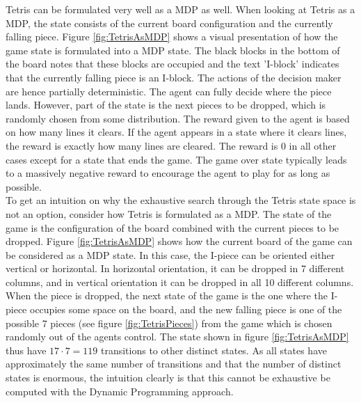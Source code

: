 Tetris can be formulated very well as a MDP as well.
When looking at Tetris as a MDP, the state consists
of the current board configuration and the currently falling piece.
Figure \ref{fig:TetrisAsMDP} shows a visual presentation 
of how the game state is formulated into a MDP state. The black
blocks in the bottom of the board notes that these blocks are 
occupied and the text 'I-block' indicates that the currently
falling piece is an I-block.
The actions of the decision maker are hence partially deterministic.
The agent can fully decide where the piece lands. However,
part of the state is the next pieces to be dropped, which is
randomly chosen from some distribution. The reward given to the agent
is based on how many lines it clears. If the agent appears in a state 
where it clears lines, the reward is exactly how many lines are cleared.
The reward is 0 in all other cases except for a state that ends the game.
The game over state typically leads to a massively negative reward to 
encourage the agent to play for as long as possible.\\
To get an intuition on why the exhaustive search through the Tetris 
state space is not an option, consider how Tetris is formulated as a MDP.
The state of the game is the configuration of the board combined with 
the current pieces to be dropped. Figure \ref{fig:TetrisAsMDP} shows
how the current board of the game can be considered as a MDP state. 
In this case, the I-piece can be oriented either vertical or horizontal. 
In horizontal orientation, it can be dropped in 7 different columns,
and in vertical orientation it can be dropped in all 10 different columns.
When the piece is dropped, the next state of the game is the one 
where the I-piece occupies some space on the board, and the new falling piece
is one of the possible 7 pieces (see figure \ref{fig:TetrisPieces}) 
from the game which is chosen randomly 
out of the agents control. The state shown in figure \ref{fig:TetrisAsMDP}
thus have $17 \cdot 7 = 119$ transitions to other distinct states.
As all states have approximately the same number of transitions
and that the number of distinct states is enormous, the intuition 
clearly is that this cannot be exhaustive be computed with the Dynamic 
Programming approach.
